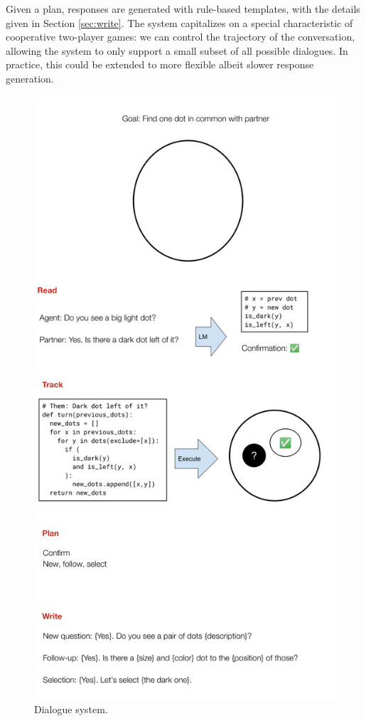 \documentclass[11pt]{article}
\begin{document}
Given a plan, responses are generated with rule-based templates,
with the details given in Section \ref{sec:write}.
The system capitalizes on a special characteristic of cooperative two-player games: 
we can control the trajectory of the conversation,
allowing the system to only support a small subset of all possible dialogues.
In practice, this could be extended to more flexible albeit slower response generation.

\begin{figure}[t]
\centering
\includegraphics[width=\columnwidth]{imgs/Onecommon System.png}
\caption{\label{fig:system}
Dialogue system.
}
\end{figure}
\end{document}
